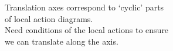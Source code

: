 \documentclass[preview]{standalone}
\begin{document}
Translation axes correspond to `cyclic' parts \\ of local action diagrams.\\Need conditions of the local actions to ensure \\ we can translate along the axis.\\
\end{document}
